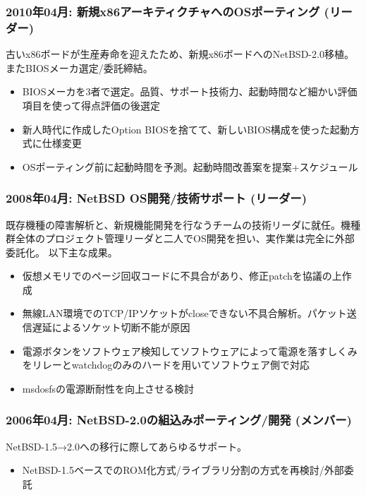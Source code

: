 \documentclass[letterpaper]{article}
\begin{document}
\subsubsection*{2010年04月: 新規x86アーキティクチャへのOSポーティング (リーダー)}
古いx86ボードが生産寿命を迎えたため、新規x86ボードへのNetBSD-2.0移植。またBIOSメーカ選定/委託締結。

\begin{itemize}
  \item BIOSメーカを3者で選定。品質、サポート技術力、起動時間など細かい評価項目を使って得点評価の後選定
  \item 新人時代に作成したOption BIOSを捨てて、新しいBIOS構成を使った起動方式に仕様変更
  \item OSポーティング前に起動時間を予測。起動時間改善案を提案+スケジュール
\end{itemize}

\subsubsection*{2008年04月: NetBSD OS開発/技術サポート (リーダー)}
既存機種の障害解析と、新規機能開発を行なうチームの技術リーダに就任。機種群全体のプロジェクト管理リーダと二人でOS開発を担い、実作業は完全に外部委託化。
以下主な成果。

\begin{itemize}
  \item 仮想メモリでのページ回収コードに不具合があり、修正patchを協議の上作成
  \item 無線LAN環境でのTCP/IPソケットがcloseできない不具合解析。パケット送信遅延によるソケット切断不能が原因
  \item 電源ボタンをソフトウェア検知してソフトウェアによって電源を落すしくみをリレーとwatchdogのみのハードを用いてソフトウェア側で対応
  \item msdosfsの電源断耐性を向上させる検討
\end{itemize}

\subsubsection*{2006年04月: NetBSD-2.0の組込みポーティング/開発 (メンバー)}
NetBSD-1.5→2.0への移行に際してあらゆるサポート。

\begin{itemize}
  \item NetBSD-1.5ベースでのROM化方式/ライブラリ分割の方式を再検討/外部委託
\end{itemize}
\end{document}
